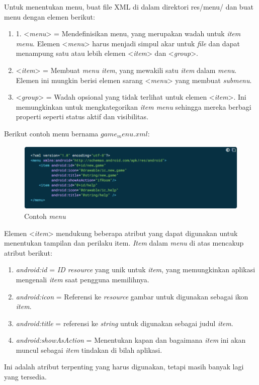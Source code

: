 \begin{enumerate}
Untuk menentukan menu, buat file XML di dalam direktori res/menu/ dan buat menu dengan elemen berikut:
	\begin{enumerate}
	\item 1.	<\textit{menu}> = Mendefinisikan menu, yang merupakan wadah untuk \textit{item menu}. Elemen <\textit{menu}> harus menjadi simpul akar untuk \textit{file} dan dapat menampung satu atau lebih elemen <\textit{item}> dan <\textit{group}>.
	\item <\textit{item}> = Membuat \textit{menu item}, yang mewakili satu \textit{item} dalam \textit{menu}. Elemen ini mungkin berisi elemen sarang <\textit{menu}> yang membuat \textit{submenu}.
	\item <\textit{group}> = Wadah opsional yang tidak terlihat untuk elemen <\textit{item}>. Ini memungkinkan untuk mengkategorikan \textit{item menu} sehingga mereka berbagi properti seperti status aktif dan visibilitas.
	\end{enumerate}

Berikut contoh menu bernama $game_menu.xml$:
\begin{figure}[H]
	\centering
	\includegraphics[keepaspectratio, width=12cm]{gambar/menu}
	\caption{Contoh \textit{menu} \citep{developerandroid}}
	\label{gambar:gambar_41}
\end{figure}

Elemen <\textit{item}> mendukung beberapa atribut yang dapat digunakan untuk menentukan tampilan dan perilaku item. \textit{Item} dalam \textit{menu} di atas mencakup atribut berikut:
	\begin{enumerate}
	\item \textit{android:id} = \textit{ID resource} yang unik untuk \textit{item}, yang memungkinkan aplikasi mengenali \textit{item} saat pengguna memilihnya.
	\item \textit{android:icon} = Referensi ke \textit{resource} gambar untuk digunakan sebagai ikon \textit{item}.
	\item \textit{android:title} = referensi ke \textit{string} untuk digunakan sebagai judul \textit{item}.
	\item \textit{android:showAsAction} = Menentukan kapan dan bagaimana \textit{item} ini akan muncul sebagai \textit{item} tindakan di bilah aplikasi.
	\end{enumerate}
Ini adalah atribut terpenting yang harus digunakan, tetapi masih banyak lagi yang tersedia.
\end{enumerate}

